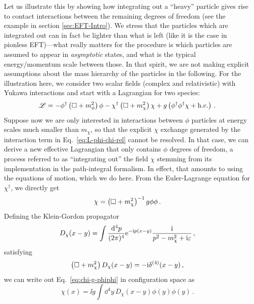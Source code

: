 Let us illustrate this by showing how integrating out a ``heavy'' 
particle gives rise to contact interactions between the remaining degrees 
of freedom (see the example in section \ref{sec:EFT-Intro}).  We 
stress that the particles which are integrated out can in fact be lighter than 
what is left (like it is the case in pionless EFT)---what really matters for 
the procedure is which particles are assumed to appear in \emph{asymptotic} 
states, and what is the typical energy/momentum scale between those.  In that 
spirit, we are not making explicit assumptions about the mass hierarchy of the 
particles in the following.  For the illustration here, we consider two scalar 
fields (complex and relativistic) with Yukawa interactions and start with a 
Lagrangian for two species:
%
\begin{equation}
 \LL = {-}\phi^\dagger\left(\dAlem + m_\phi^2\right)\phi
 - \chi^\dagger\left(\dAlem + m_\chi^2\right)\chi
 + g\left(\phi^\dagger\phi^\dagger\chi + \hc\right) \,.
\label{eq:L-phi-chi-rel}
\end{equation}
%
Suppose now we are only interested in interactions between $\phi$ particles 
at energy scales much smaller than $m_\chi$, so that the explicit 
$\chi$ exchange generated by the interaction term in 
Eq.~\eqref{eq:L-phi-chi-rel} cannot be resolved.  In that case, we can derive a 
new effective Lagrangian that only contains $\phi$ degrees of freedom, a 
process referred to as ``integrating out'' the field $\chi$ stemming from its 
implementation in the path-integral formalism.  In effect, that amounts to 
using the equations of motion, which we do here.  From the Euler-Lagrange 
equation for $\chi^\dagger$, we directly get
%
\begin{equation}
 \chi = \left(\dAlem + m_\chi^2\right)^{-1} g\phi\phi \,.
\label{eq:chi-g-phiphi}
\end{equation}
%
Defining the Klein-Gordon propagator
%
\begin{equation}
 D_\chi(x-y)
 = \int\frac{\dd^4p}{(2\pi)^4} \eex^{{-}\ii p(x-y)}
 \frac{\ii}{p^2-m_\chi^2 + \ii\eps} \,,
\label{eq:D-chi-KG}
\end{equation}
%
satisfying
%
\begin{equation}
 \left(\dAlem + m_\chi^2\right)D_\chi(x-y) = {-}\ii \delta^{(4)}(x-y) \,,
\label{eq:chi-GF}
\end{equation}
%
we can write out Eq.~\eqref{eq:chi-g-phiphi} in configuration space as
%
\begin{equation}
 \chi(x) = \ii g \int\dd^4y \, D_\chi(x-y) \phi(y) \phi(y) \,.
\end{equation}

